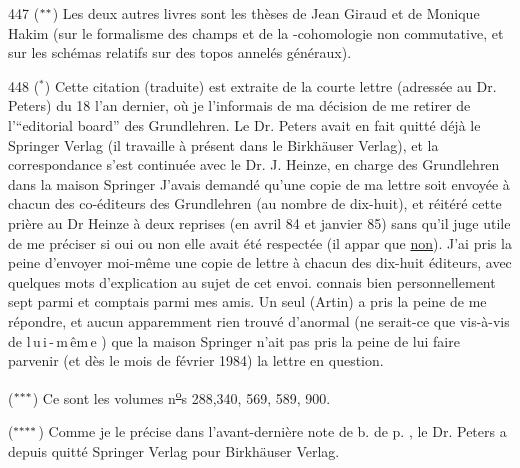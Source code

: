 447 \quad ($^{\ast\ast}$) Les deux autres livres sont les thèses de Jean Giraud et de  Monique Hakim (sur le formalisme des champs et de la -cohomologie non commutative, et sur les schémas relatifs sur des topos annelés généraux).

448 \quad ($^{\ast}$) Cette citation (traduite) est extraite de la courte lettre (adressée au Dr. Peters) du 18  l'an dernier, où je l'informais de ma décision de me retirer de l'``editorial board'' des Grundlehren. Le Dr. Peters avait en fait quitté déjà le Springer Verlag (il travaille à présent dans le Birkhäuser Verlag), et la correspondance s'est continuée avec le  Dr. J. Heinze, en charge des Grundlehren dans la maison Springer  J'avais demandé qu'une copie de ma lettre soit envoyée à chacun des co-éditeurs des Grundlehren (au nombre de dix-huit), et  réitéré cette prière au Dr Heinze\deleted{\unsure{,}} à deux reprises (en avril 84 et janvier 85) sans qu'il juge utile de me  préciser si oui ou non elle avait été respectée (il  appar que \uline{non}). J'ai pris la peine d'envoyer moi-même une copie de  lettre  à chacun des dix-huit éditeurs, avec quelques mots d'explication  au sujet de cet envoi.   connais bien personnellement sept parmi \handwritten{,}  et   comptais  parmi mes amis. Un seul \deleted{\unsure{(}} (Artin) a pris la peine de me répondre, et aucun apparemment  rien trouvé d'anormal  (ne serait-ce que vis-à-vis de \mbox{l\,u\,i\,-\,m\,êm\,e} ) que la maison Springer n'ait pas  pris la peine de lui faire parvenir   (et dès le mois de février 1984) la lettre en question.

($^{\ast\ast\ast}$) Ce sont les volumes n\textsuperscript{\uline{o}}s 288,340, 569, 589, 900.

($^{\ast\ast\ast\ast}$) Comme je le précise dans l'avant-dernière note de b. de p. , le Dr. Peters a depuis quitté  Springer Verlag pour Birkhäuser Verlag.

